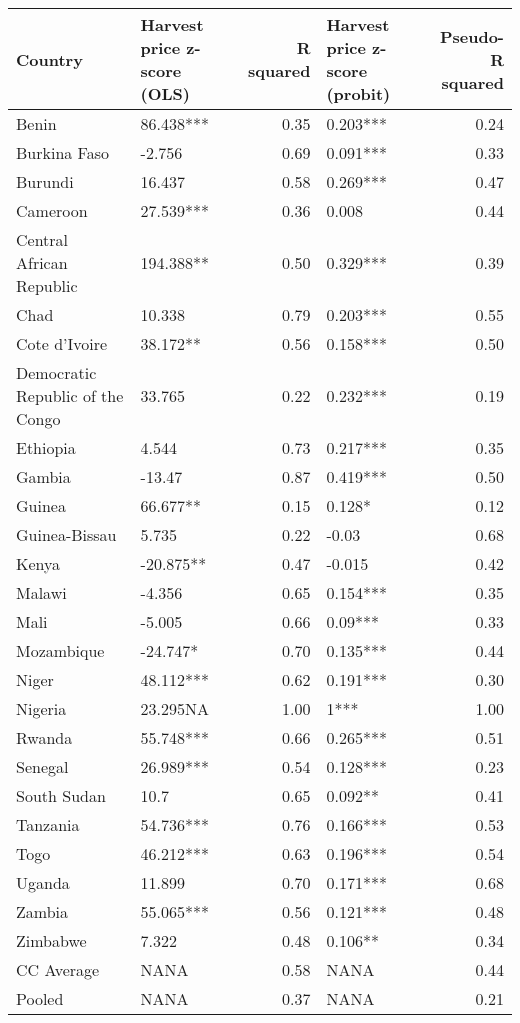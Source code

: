 \begin{table}[ht]
\centering
\begin{tabular}{llrlr}
  \hline
Country & Harvest price z-score (OLS) & R squared & Harvest price z-score (probit) & Pseudo-R squared \\ 
  \hline
Benin & 86.438*** & 0.35 & 0.203*** & 0.24 \\ 
  Burkina Faso & -2.756  & 0.69 & 0.091*** & 0.33 \\ 
  Burundi & 16.437  & 0.58 & 0.269*** & 0.47 \\ 
  Cameroon & 27.539*** & 0.36 & 0.008  & 0.44 \\ 
  Central African Republic & 194.388**  & 0.50 & 0.329*** & 0.39 \\ 
  Chad & 10.338  & 0.79 & 0.203*** & 0.55 \\ 
  Cote d'Ivoire & 38.172**  & 0.56 & 0.158*** & 0.50 \\ 
  Democratic Republic of the Congo & 33.765  & 0.22 & 0.232*** & 0.19 \\ 
  Ethiopia & 4.544  & 0.73 & 0.217*** & 0.35 \\ 
  Gambia & -13.47  & 0.87 & 0.419*** & 0.50 \\ 
  Guinea & 66.677**  & 0.15 & 0.128*  & 0.12 \\ 
  Guinea-Bissau & 5.735  & 0.22 & -0.03  & 0.68 \\ 
  Kenya & -20.875**  & 0.47 & -0.015  & 0.42 \\ 
  Malawi & -4.356  & 0.65 & 0.154*** & 0.35 \\ 
  Mali & -5.005  & 0.66 & 0.09*** & 0.33 \\ 
  Mozambique & -24.747*  & 0.70 & 0.135*** & 0.44 \\ 
  Niger & 48.112*** & 0.62 & 0.191*** & 0.30 \\ 
  Nigeria & 23.295NA & 1.00 & 1*** & 1.00 \\ 
  Rwanda & 55.748*** & 0.66 & 0.265*** & 0.51 \\ 
  Senegal & 26.989*** & 0.54 & 0.128*** & 0.23 \\ 
  South Sudan & 10.7  & 0.65 & 0.092**  & 0.41 \\ 
  Tanzania & 54.736*** & 0.76 & 0.166*** & 0.53 \\ 
  Togo & 46.212*** & 0.63 & 0.196*** & 0.54 \\ 
  Uganda & 11.899  & 0.70 & 0.171*** & 0.68 \\ 
  Zambia & 55.065*** & 0.56 & 0.121*** & 0.48 \\ 
  Zimbabwe & 7.322  & 0.48 & 0.106**  & 0.34 \\ 
  CC Average & NANA & 0.58 & NANA & 0.44 \\ 
  Pooled & NANA & 0.37 & NANA & 0.21 \\ 
   \hline
\end{tabular}
\end{table}

